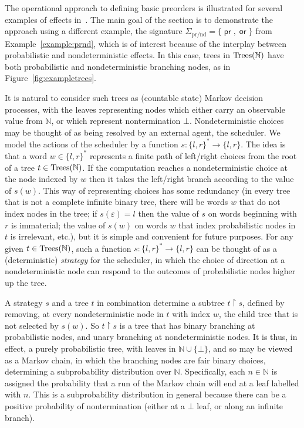 \documentclass[a4paper,UKenglish]{lipics-v2018}
\newcommand{\Trees}{\textnormal{Trees}}
\newcommand{\prEff}{\operatorname{\textsf{pr}}}
\newcommand{\orEff}{\operatorname{\textsf{or}}}
\newcommand{\prnd}{\text{pr/nd}}
\theoremstyle{plain}
\begin{document}
The operational approach to defining basic preorders is illustrated for several examples of effects in~\cite{gom}. 
The main goal of the section is to demonstrate the approach using a different example, the signature
$\Sigma_\prnd = \{\prEff,\orEff\}$ from Example~\ref{example:prnd}, which is of interest because of the 
interplay between probabilistic and nondeterministic effects. 
In this case, trees in $\Trees(\mathbb{N})$ have both probabilistic and nondeterministic branching nodes,
as in Figure~\ref{fig:exampletrees}.


It is natural to consider such trees as (countable state) Markov decision processes, with the leaves representing nodes which either carry an observable value from $\mathbb{N}$, or which represent nontermination $\bot$.
Nondeterministic choices may be thought of as being resolved by an external agent, the scheduler. We model the actions of the scheduler by a 
function $s: \{l,r\}^* \to \{l,r\}$. The idea is that a word $w \in \{l,r\}^*$ represents a finite path of left/right choices from the root of a 
tree $t \in \Trees(\mathbb{N})$. If the computation reaches a nondeterministic choice at the node indexed by 
$w$ then it takes the left/right branch according to the value of $s(w)$. This way of representing choices has some redundancy
(in every tree that is not a complete infinite binary tree, there will be words $w$ that do not index nodes in the tree; if $s(\varepsilon) = l$ then the value of $s$ on words beginning with $r$ is immaterial; the value of $s(w)$ on words $w$ that index 
probabilistic nodes in $t$ is irrelevant, etc.), but it is simple and convenient for future purposes. 
For any given $t \in \Trees(\mathbb{N})$, such a function
$s: \{l,r\}^* \to \{l,r\}$ can be thought of as a (deterministic) \emph{strategy} for the scheduler, in which the choice of direction at a nondeterministic node  
can respond to  the outcomes of probabilistic nodes higher up the tree.

A strategy $s$ and a tree $t$ in combination determine a subtree $t\restriction s$, defined by 
removing, at every nondeterministic node in $t$ with index $w$, the child tree that is not selected by $s(w)$. So $t\restriction s$ is a tree that has binary branching at probabilistic nodes, and unary branching at nondeterministic nodes. It is thus, in effect, a purely probabilistic tree, with leaves in $\mathbb{N}\cup\{\bot\}$, and so may be viewed as a Markov chain, in which the branching nodes are fair binary choices, determining  a subprobability distribution over $\mathbb{N}$. Specifically, each $n \in \mathbb{N}$ is assigned the probability that a run of the Markov chain will end at a leaf labelled with $n$. This is a subprobability distribution in general because there can  be a positive probability of nontermination (either at a $\bot$ leaf, or along an infinite branch).
\end{document}
